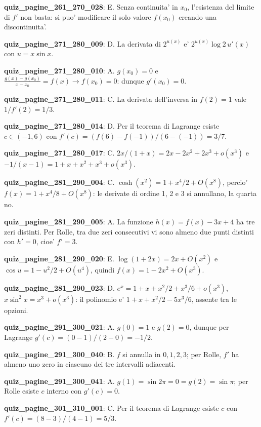 \documentclass[11pt,a4paper]{article}
\newcounter{quiz}
\begin{document}
\noindent\textbf{quiz\_pagine\_261\_270\_028}: E. Senza continuita' in $x_0$, l'esistenza del limite di $f'$ non basta: si puo' modificare il solo valore $f(x_0)$ creando una discontinuita'.\par\medskip
\noindent\textbf{quiz\_pagine\_271\_280\_009}: D. La derivata di $2^{u(x)}$ e' $2^{u(x)}\log2\,u'(x)$ con $u=x\sin x$.\par\medskip
\noindent\textbf{quiz\_pagine\_271\_280\_010}: A. $g(x_0)=0$ e $\frac{g(x)-g(x_0)}{x-x_0}=f(x)\to f(x_0)=0$: dunque $g'(x_0)=0$.\par\medskip
\noindent\textbf{quiz\_pagine\_271\_280\_011}: C. La derivata dell'inversa in $f(2)=1$ vale $1/f'(2)=1/3$.\par\medskip
\noindent\textbf{quiz\_pagine\_271\_280\_014}: D. Per il teorema di Lagrange esiste $c\in(-1,6)$ con $f'(c)=(f(6)-f(-1))/(6-(-1))=3/7$.\par\medskip
\noindent\textbf{quiz\_pagine\_271\_280\_017}: C. $2x/(1+x)=2x-2x^2+2x^3+o(x^3)$ e $-1/(x-1)=1+x+x^2+x^3+o(x^3)$.\par\medskip
\noindent\textbf{quiz\_pagine\_281\_290\_004}: C. $\cosh(x^2)=1+x^4/2+O(x^8)$, percio' $f(x)=1+x^4/8+O(x^8)$: le derivate di ordine 1, 2 e 3 si annullano, la quarta no.\par\medskip
\noindent\textbf{quiz\_pagine\_281\_290\_005}: A. La funzione $h(x)=f(x)-3x+4$ ha tre zeri distinti. Per Rolle, tra due zeri consecutivi vi sono almeno due punti distinti con $h'=0$, cioe' $f'=3$.\par\medskip
\noindent\textbf{quiz\_pagine\_281\_290\_020}: E. $\log(1+2x)=2x+O(x^2)$ e $\cos u=1-u^2/2+O(u^4)$, quindi $f(x)=1-2x^2+O(x^3)$.\par\medskip
\noindent\textbf{quiz\_pagine\_281\_290\_023}: D. $e^x=1+x+x^2/2+x^3/6+o(x^3)$, $x\sin^2x=x^3+o(x^3)$: il polinomio e' $1+x+x^2/2-5x^3/6$, assente tra le opzioni.\par\medskip
\noindent\textbf{quiz\_pagine\_291\_300\_021}: A. $g(0)=1$ e $g(2)=0$, dunque per Lagrange $g'(c)=(0-1)/(2-0)=-1/2$.\par\medskip
\noindent\textbf{quiz\_pagine\_291\_300\_040}: B. $f$ si annulla in $0,1,2,3$; per Rolle, $f'$ ha almeno uno zero in ciascuno dei tre intervalli adiacenti.\par\medskip
\noindent\textbf{quiz\_pagine\_291\_300\_041}: A. $g(1)=\sin2\pi=0=g(2)=\sin\pi$; per Rolle esiste $c$ interno con $g'(c)=0$.\par\medskip
\noindent\textbf{quiz\_pagine\_301\_310\_001}: C. Per il teorema di Lagrange esiste $c$ con $f\prime(c)=(8-3)/(4-1)=5/3$.\par\medskip
\end{document}
